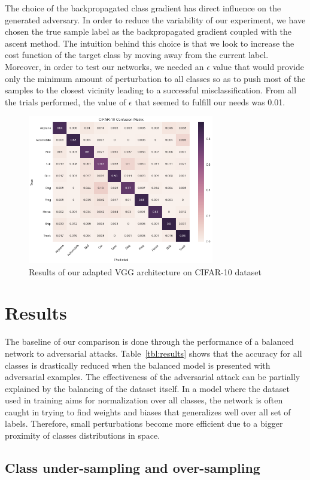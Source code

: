 \documentclass[runningheads,a4paper]{llncs}
\begin{document}
The choice of the backpropagated class gradient has direct influence on the generated adversary. In order to reduce the variability of our experiment, we have chosen the true sample label as the backpropagated gradient coupled with the ascent method. The intuition behind this choice is that we look to increase the cost function of the target class by moving away from the current label. Moreover, in order to test our networks, we needed an $\epsilon$ value that would provide only the minimum amount of perturbation to all classes so as to push most of the samples to the closest vicinity leading to a successful misclassification. From all the trials performed, the value of $\epsilon$ that seemed to fulfill our needs was 0.01. 
\begin{figure}
	\centering
	\includegraphics[height=6.5cm]{conf_matrix.png}
	\caption{Results of our adapted VGG architecture on CIFAR-10 dataset}
	\label{fig:conf_matrix_full}
\end{figure}


\section{Results}
The baseline of our comparison is done through the performance of a balanced network to adversarial attacks. Table~\ref{tbl:results} shows that the accuracy for all classes is drastically reduced when the balanced model is presented with adversarial examples. The effectiveness of the adversarial attack can be partially explained by the balancing of the dataset itself. In a model where the dataset used in training aims for normalization over all classes, the network is often caught in trying to find weights and biases that generalizes well over all set of labels. Therefore, small perturbations become more efficient due to a bigger proximity of classes distributions in space.


\subsection{Class under-sampling and over-sampling}
\end{document}

